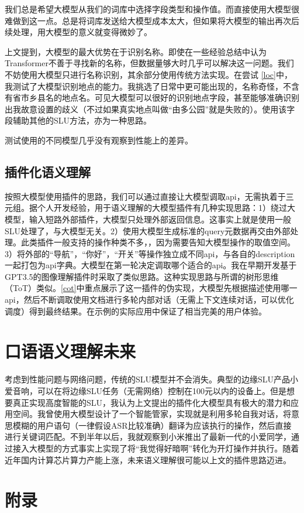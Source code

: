 \documentclass{article}
\begin{document}
			我们总是希望大模型从我们的词库中选择字段类型和操作值。而直接使用大模型很难做到这一点。总是将词库发送给大模型成本太大，但如果将大模型的输出再次后续处理，用大模型的意义就变得微妙了。
		
			上文提到，大模型的最大优势在于识别名称。即使在一些经验总结中认为Transformer不善于寻找新的名称，但数据量够大时几乎可以解决这一问题。我们不妨使用大模型只进行名称识别，其余部分使用传统方法实现。在尝试 \ref{loc}中，我测试了大模型识别地点的能力。我挑选了日常中更可能出现的，名称奇怪，不含有省市乡县名的地点名。可见大模型可以很好的识别地点字段，甚至能够准确识别出我故意设置的歧义（不过如果真实地点叫做“由多公园”就是失败的）。使用该字段辅助其他的SLU方法，亦为一种思路。
			
			测试使用的不同模型几乎没有观察到性能上的差异。
		\subsection{插件化语义理解}\label{plug}
			按照大模型使用插件的思路，我们可以通过直接让大模型调取api，无需执着于三元组。据个人开发经验，用于语义理解的大模型插件有几种实现思路：1）绕过大模型，输入短路外部插件，大模型只处理外部返回信息。这事实上就是使用一般SLU处理了，与大模型无关。2）使用大模型生成标准的query元数据再交由外部处理。此类插件一般支持的操作种类不多，，因为需要告知大模型操作的取值空间。3）将外部的“导航”，“你好”，“开关”等操作独立成不同api，与各自的description一起打包为api字典。大模型在第一轮决定调取哪个适合的api。我在早期开发基于GPT3.5的图像理解插件时采取了类似思路。这种实现思路与所谓的树形思维（ToT）类似。\ref{cot}中重点展示了这一插件的伪实现，大模型先根据描述使用哪一api，然后不断调取使用文档进行多轮内部对话（无需上下文连续对话，可以优化调度）得到最终结果。在示例的实际应用中保证了相当完美的用户体验。
	\section{口语语义理解未来}
		考虑到性能问题与网络问题，传统的SLU模型并不会消失。典型的边缘SLU产品小爱音响，可以在将边缘SLU任务（无需网络）控制在100元以内的设备上。但是想要真正实现高度智能的SLU，我认为上文提出的插件化大模型具有极大的潜力和应用空间。我曾使用大模型设计了一个智能管家，实现就是利用多轮自我对话，将意思模糊的用户语句（一律假设ASR比较准确）翻译为应该执行的操作，然后直接进行关键词匹配。不到半年以后，我就观察到小米推出了最新一代的小爱同学，通过接入大模型的方式事实上实现了将“我觉得好暗啊”转化为开灯操作并执行。随着近年国内计算芯片算力产能上涨，未来语义理解很可能以上文的插件思路迈进。
	\section{附录}
	
\end{document}
